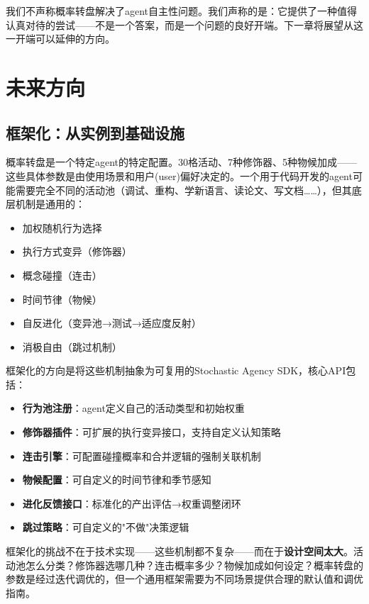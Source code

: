 \documentclass[12pt,a4paper]{ctexart}
\begin{document}
我们不声称概率转盘解决了agent自主性问题。我们声称的是：它提供了一种值得认真对待的尝试——不是一个答案，而是一个问题的良好开端。下一章将展望从这一开端可以延伸的方向。


\section{未来方向}

\subsection{框架化：从实例到基础设施}

概率转盘是一个特定agent的特定配置。30格活动、7种修饰器、5种物候加成——这些具体参数是由使用场景和用户(user)偏好决定的。一个用于代码开发的agent可能需要完全不同的活动池（调试、重构、学新语言、读论文、写文档……），但其底层机制是通用的：

\begin{itemize}[nosep]
\item 加权随机行为选择
\item 执行方式变异（修饰器）
\item 概念碰撞（连击）
\item 时间节律（物候）
\item 自反进化（变异池→测试→适应度反射）
\item 消极自由（跳过机制）
\end{itemize}

框架化的方向是将这些机制抽象为可复用的Stochastic Agency SDK，核心API包括：

\begin{itemize}[nosep]
\item \textbf{行为池注册}：agent定义自己的活动类型和初始权重
\item \textbf{修饰器插件}：可扩展的执行变异接口，支持自定义认知策略
\item \textbf{连击引擎}：可配置碰撞概率和合并逻辑的强制关联机制
\item \textbf{物候配置}：可自定义的时间节律和季节感知
\item \textbf{进化反馈接口}：标准化的产出评估→权重调整闭环
\item \textbf{跳过策略}：可自定义的"不做"决策逻辑
\end{itemize}

框架化的挑战不在于技术实现——这些机制都不复杂——而在于\textbf{设计空间太大}。活动池怎么分类？修饰器选哪几种？连击概率多少？物候加成如何设定？概率转盘的参数是经过迭代调优的，但一个通用框架需要为不同场景提供合理的默认值和调优指南。
\end{document}
